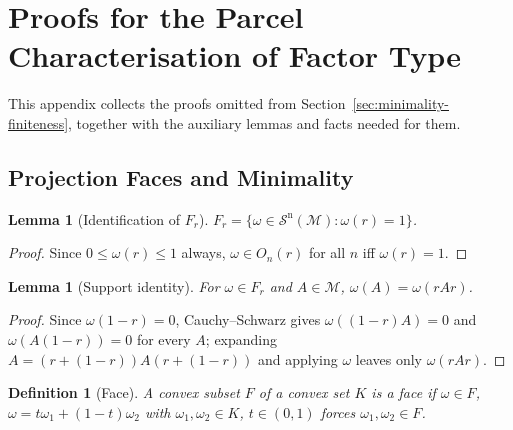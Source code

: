 \documentclass[11pt]{article}
\newtheorem{definition}[theorem]{Definition}
\newtheorem{lemma}[theorem]{Lemma}
\newcommand{\Sn}{\mathcal{S}^{\mathrm n}}
\begin{document}
\section{Proofs for the Parcel Characterisation of Factor Type}
\label{app:parcelproofs}

This appendix collects the proofs omitted from
Section~\ref{sec:minimality-finiteness}, together with the auxiliary
lemmas and facts needed for them.

\subsection{Projection Faces and Minimality}

\begin{lemma}[Identification of $F_r$]
\label{lem:limit}
$F_r=\{\omega\in\Sn(\mathcal M):\omega(r)=1\}$.
\end{lemma}

\begin{proof}
Since $0\le\omega(r)\le1$ always, $\omega\in O_n(r)$ for all $n$ iff
$\omega(r)=1$.
\end{proof}

\begin{lemma}[Support identity]
\label{lem:support}
For $\omega\in F_r$ and $A\in\mathcal M$, $\omega(A)=\omega(rAr)$.
\end{lemma}

\begin{proof}
Since $\omega(1-r)=0$, Cauchy--Schwarz gives $\omega((1-r)A)=0$ and
$\omega(A(1-r))=0$ for every $A$; expanding
$A=(r+(1-r))A(r+(1-r))$ and applying $\omega$ leaves only $\omega(rAr)$.
\end{proof}

\begin{definition}[Face]
A convex subset $F$ of a convex set $K$ is a \emph{face} if $\omega\in
F$, $\omega=t\omega_1+(1-t)\omega_2$ with $\omega_1,\omega_2\in K$,
$t\in(0,1)$ forces $\omega_1,\omega_2\in F$.
\end{definition}
\end{document}
